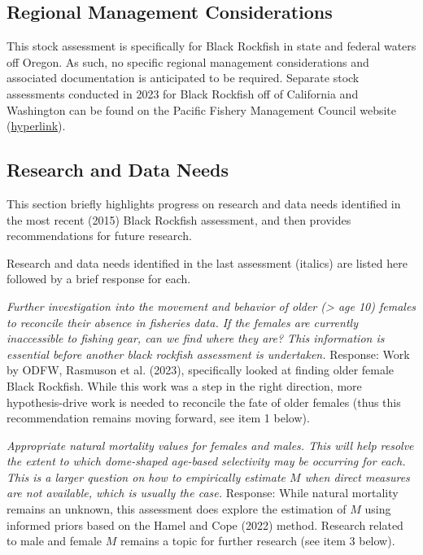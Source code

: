 \documentclass[11pt,
  english,
  letterpaper,
]{article}
\begin{document}
\hypertarget{regional-management-considerations}{%
\subsection{Regional Management Considerations}\label{regional-management-considerations}}

This stock assessment is specifically for Black Rockfish in state and federal waters off Oregon. As such, no specific regional management considerations and associated documentation is anticipated to be required. Separate stock assessments conducted in 2023 for Black Rockfish off of California and Washington can be found on the Pacific Fishery Management Council website (\href{https://www.pcouncil.org/stock-assessments-star-reports-stat-reports-rebuilding-analyses-terms-of-reference/groundfish-stock-assessment-documents/}{hyperlink}).

\hypertarget{research-and-data-needs-1}{%
\subsection{Research and Data Needs}\label{research-and-data-needs-1}}

This section briefly highlights progress on research and data needs identified in the most recent (2015) Black Rockfish assessment, and then provides recommendations for future research.

Research and data needs identified in the last assessment (italics) are listed here followed by a brief response for each.

\textit{Further investigation into the movement and behavior of older (> age 10) females to reconcile their absence in fisheries data. If the females are currently inaccessible to fishing gear, can we find where they are? This information is essential before another black rockfish assessment is undertaken.} Response: Work by ODFW, Rasmuson et al. (2023), specifically looked at finding older female Black Rockfish. While this work was a step in the right direction, more hypothesis-drive work is needed to reconcile the fate of older females (thus this recommendation remains moving forward, see item 1 below).

\textit{Appropriate natural mortality values for females and males. This will help resolve the extent to which dome-shaped age-based selectivity may be occurring for each. This is a larger question on how to empirically estimate $M$ when direct measures are not available, which is usually the case.} Response: While natural mortality remains an unknown, this assessment does explore the estimation of \(M\) using informed priors based on the Hamel and Cope (2022) method. Research related to male and female \(M\) remains a topic for further research (see item 3 below).
\end{document}
